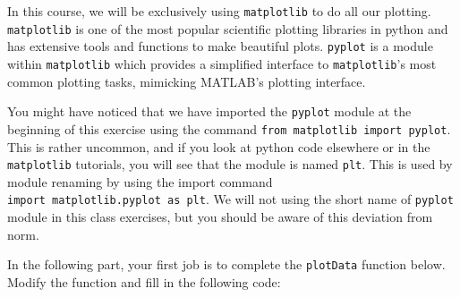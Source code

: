 \documentclass[11pt]{article}
\newenvironment{Shaded}{}{}
\newcommand{\DecValTok}[1]{\textcolor[rgb]{0.25,0.63,0.44}{{#1}}}
\newcommand{\StringTok}[1]{\textcolor[rgb]{0.25,0.44,0.63}{{#1}}}
\newcommand{\NormalTok}[1]{{#1}}
\newcommand{\OperatorTok}[1]{\textcolor[rgb]{0.40,0.40,0.40}{{#1}}}
\begin{document}
In this course, we will be exclusively using \texttt{matplotlib} to do
all our plotting. \texttt{matplotlib} is one of the most popular
scientific plotting libraries in python and has extensive tools and
functions to make beautiful plots. \texttt{pyplot} is a module within
\texttt{matplotlib} which provides a simplified interface to
\texttt{matplotlib}'s most common plotting tasks, mimicking MATLAB's
plotting interface.

You might have noticed that we have imported the \texttt{pyplot} module
at the beginning of this exercise using the command
\texttt{from\ matplotlib\ import\ pyplot}. This is rather uncommon, and
if you look at python code elsewhere or in the \texttt{matplotlib}
tutorials, you will see that the module is named \texttt{plt}. This is
used by module renaming by using the import command
\texttt{import\ matplotlib.pyplot\ as\ plt}. We will not using the short
name of \texttt{pyplot} module in this class exercises, but you should
be aware of this deviation from norm.

In the following part, your first job is to complete the
\texttt{plotData} function below. Modify the function and fill in the
following code:

\begin{Shaded}
\end{Shaded}
\end{document}

